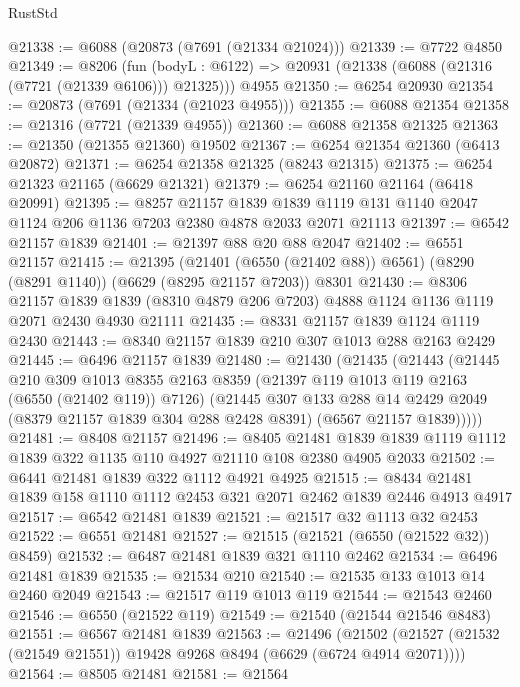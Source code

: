 \begin{lexlean}{RustStd}
\begin{coremodule}
@21338 := @6088 (@20873 (@7691 (@21334 @21024)))
@21339 := @7722 @4850
@21349 := @8206
    (fun (bodyL : @6122) => @20931 (@21338 (@6088 (@21316 (@7721 (@21339 @6106))) @21325)))
    @4955
@21350 := @6254 @20930
@21354 := @20873 (@7691 (@21334 (@21023 @4955)))
@21355 := @6088 @21354
@21358 := @21316 (@7721 (@21339 @4955))
@21360 := @6088 @21358 @21325
@21363 := @21350 (@21355 @21360) @19502
@21367 := @6254 @21354 @21360 (@6413 @20872)
@21371 := @6254 @21358 @21325 (@8243 @21315)
@21375 := @6254 @21323 @21165 (@6629 @21321)
@21379 := @6254 @21160 @21164 (@6418 @20991)
@21395 := @8257
    @21157
    @1839
    @1839
    @1119
    @131
    @1140
    @2047
    @1124
    @206
    @1136
    @7203
    @2380
    @4878
    @2033
    @2071
    @21113
@21397 := @6542 @21157 @1839
@21401 := @21397 @88 @20 @88 @2047
@21402 := @6551 @21157
@21415 := @21395
    (@21401 (@6550 (@21402 @88)) @6561)
    (@8290 (@8291 @1140))
    (@6629 (@8295 @21157 @7203))
    @8301
@21430 := @8306
    @21157
    @1839
    @1839
    (@8310 @4879 @206 @7203)
    @4888
    @1124
    @1136
    @1119
    @2071
    @2430
    @4930
    @21111
@21435 := @8331 @21157 @1839 @1124 @1119 @2430
@21443 := @8340 @21157 @1839 @210 @307 @1013 @288 @2163 @2429
@21445 := @6496 @21157 @1839
@21480 := @21430
    (@21435
      (@21443
        (@21445
          @210
          @309
          @1013
          @8355
          @2163
          @8359
          (@21397 @119 @1013 @119 @2163 (@6550 (@21402 @119)) @7126)
          (@21445
            @307
            @133
            @288
            @14
            @2429
            @2049
            (@8379 @21157 @1839 @304 @288 @2428 @8391)
            (@6567 @21157 @1839)))))
@21481 := @8408 @21157
@21496 := @8405
    @21481
    @1839
    @1839
    @1119
    @1112
    @1839
    @322
    @1135
    @110
    @4927
    @21110
    @108
    @2380
    @4905
    @2033
@21502 := @6441 @21481 @1839 @322 @1112 @4921 @4925
@21515 := @8434 @21481 @1839 @158 @1110 @1112 @2453 @321 @2071 @2462 @1839 @2446 @4913 @4917
@21517 := @6542 @21481 @1839
@21521 := @21517 @32 @1113 @32 @2453
@21522 := @6551 @21481
@21527 := @21515 (@21521 (@6550 (@21522 @32)) @8459)
@21532 := @6487 @21481 @1839 @321 @1110 @2462
@21534 := @6496 @21481 @1839
@21535 := @21534 @210
@21540 := @21535 @133 @1013 @14 @2460 @2049
@21543 := @21517 @119 @1013 @119
@21544 := @21543 @2460
@21546 := @6550 (@21522 @119)
@21549 := @21540 (@21544 @21546 @8483)
@21551 := @6567 @21481 @1839
@21563 := @21496
    (@21502 (@21527 (@21532 (@21549 @21551)) @19428 @9268 @8494 (@6629 (@6724 @4914 @2071))))
@21564 := @8505 @21481
@21581 := @21564

\end{coremodule}
\end{lexlean}
